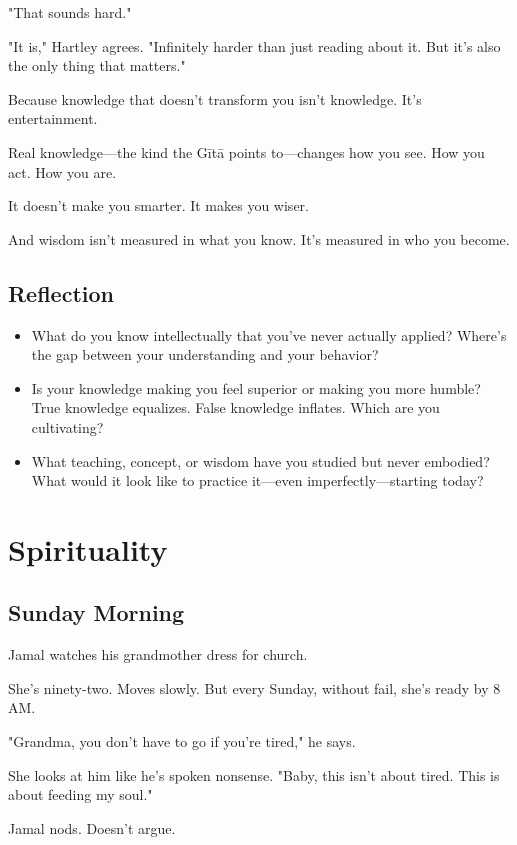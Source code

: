 \documentclass[11pt,twoside]{book}
\begin{document}
"That sounds hard."

"It is," Hartley agrees. "Infinitely harder than just reading about it. But it's also the only thing that matters."

Because knowledge that doesn't transform you isn't knowledge. It's entertainment.

Real knowledge—the kind the Gītā points to—changes how you see. How you act. How you are.

It doesn't make you smarter. It makes you wiser.

And wisdom isn't measured in what you know. It's measured in who you become.

\section*{Reflection}

\begin{itemize}
\item What do you know intellectually that you've never actually applied? Where's the gap between your understanding and your behavior?
\item Is your knowledge making you feel superior or making you more humble? True knowledge equalizes. False knowledge inflates. Which are you cultivating?
\item What teaching, concept, or wisdom have you studied but never embodied? What would it look like to practice it—even imperfectly—starting today?
\end{itemize}

\chapter{Spirituality}

\section*{Sunday Morning}

Jamal watches his grandmother dress for church.

She's ninety-two. Moves slowly. But every Sunday, without fail, she's ready by 8 AM.

"Grandma, you don't have to go if you're tired," he says.

She looks at him like he's spoken nonsense. "Baby, this isn't about tired. This is about feeding my soul."

Jamal nods. Doesn't argue.
\end{document}
